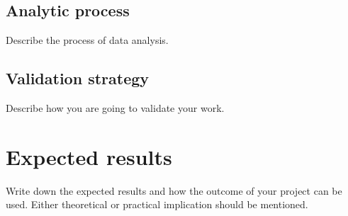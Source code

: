 \documentclass[11pt]{article}
\begin{document}
    \subsection{Analytic process}
    Describe the process of data analysis.

    \subsection{Validation strategy}
    Describe how you are going to validate your work.

    \section{Expected results}   
    Write down the expected results and how the outcome
    of your project can be used. Either theoretical or 
    practical implication should be mentioned.

    
\end{document}
